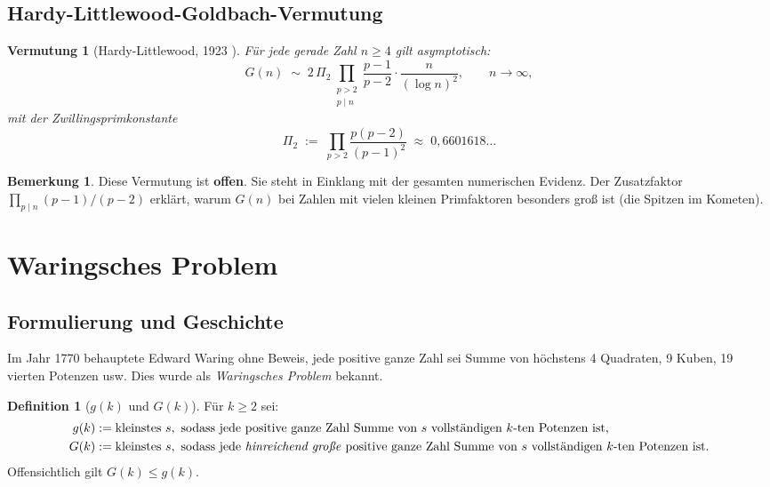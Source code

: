 \documentclass[12pt,a4paper]{amsart}
\newtheorem{vermutung}[theorem]{Vermutung}
\theoremstyle{definition}
\newtheorem{definition}[theorem]{Definition}
\newtheorem{bemerkung}[theorem]{Bemerkung}
\begin{document}
\subsection{Hardy-Littlewood-Goldbach-Vermutung}

\begin{vermutung}[Hardy-Littlewood, 1923 \cite{HardyLittlewood1923}]
\label{verm:hardy-littlewood}
F\"{u}r jede gerade Zahl $n \geq 4$ gilt asymptotisch:
\[
  G(n) \;\sim\; 2\,\Pi_2
  \prod_{\substack{p > 2 \\ p \mid n}}
  \frac{p-1}{p-2}
  \cdot \frac{n}{(\log n)^2}, \qquad n \to \infty,
\]
mit der Zwillingsprimkonstante
\[
  \Pi_2 \;:=\; \prod_{p > 2} \frac{p(p-2)}{(p-1)^2}
        \;\approx\; 0{,}6601618\ldots
\]
\end{vermutung}

\begin{bemerkung}
Diese Vermutung ist \textbf{offen}.  Sie steht in Einklang mit der
gesamten numerischen Evidenz.  Der Zusatzfaktor
$\prod_{p \mid n}(p-1)/(p-2)$ erkl\"{a}rt, warum $G(n)$ bei Zahlen
mit vielen kleinen Primfaktoren besonders gro\ss{} ist (die Spitzen
im Kometen).
\end{bemerkung}

\section{Waringsches Problem}\label{sec:waring}

\subsection{Formulierung und Geschichte}

Im Jahr 1770 behauptete Edward Waring ohne Beweis, jede positive ganze
Zahl sei Summe von h\"{o}chstens 4 Quadraten, 9 Kuben, 19 vierten
Potenzen usw.  Dies wurde als \emph{Waringsches Problem} bekannt.

\begin{definition}[$g(k)$ und $G(k)$]
F\"{u}r $k \geq 2$ sei:
\begin{align*}
  g(k) &:= \text{kleinstes } s, \text{ sodass jede positive ganze Zahl
           Summe von } s \text{ vollst\"{a}ndigen } k\text{-ten Potenzen ist,}\\
  G(k) &:= \text{kleinstes } s, \text{ sodass jede \emph{hinreichend gro\ss{}e}
           positive ganze Zahl Summe von } s \text{ vollst\"{a}ndigen }
           k\text{-ten Potenzen ist.}
\end{align*}
Offensichtlich gilt $G(k) \leq g(k)$.
\end{definition}
\end{document}
